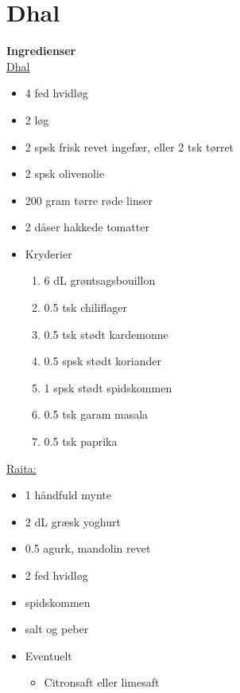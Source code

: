 \documentclass{book}
\begin{document}
\newpage \section{Dhal}
\begin{minipage}[t]{0.5\textwidth}
\textbf{Ingredienser} \\
\underline{Dhal}
\begin{itemize}
    \item 4 fed hvidløg
    \item 2 løg
    \item 2 spsk frisk revet ingefær, eller 2 tsk tørret
    \item 2 spsk olivenolie
    \item 200 gram tørre røde linser
    \item 2 dåser hakkede tomatter
    \item Kryderier
    \begin{enumerate}
        \item 6 dL grøntsagsbouillon
        \item 0.5 tsk chiliflager
        \item 0.5 tsk stødt kardemonne
        \item 0.5 spsk stødt koriander
        \item 1 spsk stødt spidskommen
        \item 0.5 tsk garam masala
        \item 0.5 tsk paprika
    \end{enumerate}
    \end{itemize} 
\underline{Raita:}
\begin{itemize} 
    \item 1 håndfuld mynte
    \item 2 dL græsk yoghurt
    \item 0.5 agurk, mandolin revet
    \item 2 fed hvidløg
    \item spidskommen
    \item salt og peber
    \item Eventuelt
    \begin{itemize}
        \item Citronsaft eller limesaft
    \end{itemize}
\end{itemize}
\end{minipage}
\end{document}
